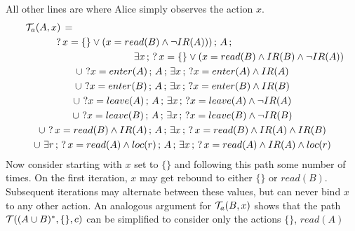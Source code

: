 All other lines are where Alice simply observes the action $x$. \begin{gather*}
\mathcal{T}_{a}(A,x)\,=\,\,\,\,\,\,\,\,\,\,\,\,\,\,\,\,\,\,\,\,\,\,\,\,\,\,\,\,\,\,\,\,\,\,\,\,\,\,\,\,\,\,\,\,\,\,\,\,\,\,\,\,\,\,\,\,\,\,\,\,\,\,\,\,\,\,\,\,\,\,\,\,\,\,\,\,\,\,\,\,\,\,\,\,\,\,\,\,\,\,\,\,\,\,\,\,\,\,\,\,\,\,\,\,\,\,\,\,\,\,\,\,\,\,\,\,\,\,\,\,\,\,\,\,\,\,\,\,\,\,\,\,\,\,\,\,\,\,\,\,\,\,\,\,\,\,\,\,\,\,\,\,\,\,\,\,\,\,\,\,\,\,\,\\
?\, x=\{\}\vee(x=read(B)\wedge\neg IR(A)))\,;\, A\,;\,\,\,\,\,\,\,\,\,\,\,\,\,\,\,\,\,\,\,\,\,\,\,\,\,\,\,\,\,\,\,\,\,\,\,\,\,\,\,\,\,\,\,\,\,\,\,\\
\,\,\,\,\,\,\,\,\,\,\,\,\,\,\,\,\,\,\,\,\,\,\,\,\,\,\,\,\,\,\,\,\,\,\,\,\,\,\,\,\,\,\,\,\,\,\,\,\,\,\,\,\,\,\,\,\,\,\,\,\,\,\,\,\,\,\,\,\,\exists x\,;\,?\, x=\{\}\vee(x=read(B)\wedge IR(B)\wedge\neg IR(A))\\
\cup\,\,?x=enter(A)\,;\, A\,;\,\exists x\,;\,?x=enter(A)\wedge IR(A)\\
\cup\,\,?x=enter(B)\,;\, A\,;\,\exists x\,;\,?x=enter(B)\wedge IR(B)\\
\cup\,\,?x=leave(A)\,;\, A\,;\,\exists x\,;\,?x=leave(A)\wedge\neg IR(A)\\
\cup\,\,?x=leave(B)\,;\, A\,;\,\exists x\,;\,?x=leave(B)\wedge\neg IR(B)\\
\cup\,\,?\, x=read(B)\wedge IR(A)\,;\, A\,;\,\exists x\,;\,?\, x=read(B)\wedge IR(A)\wedge IR(B)\\
\cup\,\,\exists r\,;\,?\, x=read(A)\wedge loc(r)\,;\, A\,;\,\exists x\,;\,?\, x=read(A)\wedge IR(A)\wedge loc(r)\end{gather*}
 Now consider starting with $x$ set to $\{\}$ and following this
path some number of times. On the first iteration, $x$ may get rebound
to either $\{\}$ or $read(B)$. Subsequent iterations may alternate
between these values, but can never bind $x$ to any other action.
An analogous argument for $\mathcal{T}_{a}(B,x)$ shows that the path $\mathcal{T}((A\cup B)^{*},\{\},c)$
can be simplified to consider only the actions $\{\}$, $read(A)$
